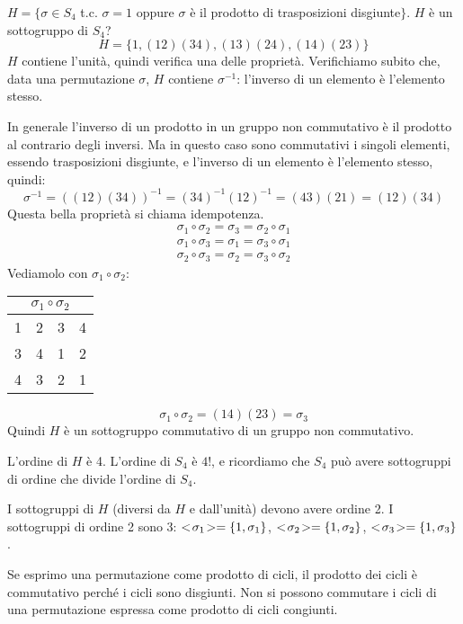 \begin{exmp}
$H = \{ \sigma \in S_4$ t.c. $\sigma = 1$ oppure $\sigma$ \`e il prodotto di trasposizioni disgiunte$ \}$. $H$ \`e un sottogruppo di $S_4$?
\[
H = \{ 1, (1 2) (3 4), (1 3) (2 4), (1 4) (2 3) \}
\]
$H$ contiene l'unit\`a, quindi verifica una delle propriet\`a. Verifichiamo subito che, data una permutazione $\sigma$, $H$ contiene $\sigma^{-1}$: l'inverso di un elemento \`e l'elemento stesso.

In generale l'inverso di un prodotto in un gruppo non commutativo \`e il prodotto al contrario degli inversi. Ma in questo caso sono commutativi i singoli elementi, essendo trasposizioni disgiunte, e l'inverso di un elemento \`e l'elemento stesso, quindi:
\[
\sigma^{-1} = \left( (1 2) (3 4) \right)^{-1} = (3 4)^{-1} (1 2)^{-1} = (4 3) (2 1) = (1 2) (3 4)
\]
Questa bella propriet\`a si chiama idempotenza.
\begin{gather*}
\sigma_1 \circ \sigma_2 = \sigma_3 = \sigma_2 \circ \sigma_1 \\
\sigma_1 \circ \sigma_3 = \sigma_1 = \sigma_3 \circ \sigma_1 \\
\sigma_2 \circ \sigma_3 = \sigma_2 = \sigma_3 \circ \sigma_2
\end{gather*}
Vediamolo con $\sigma_1 \circ \sigma_2$:
\begin{table}[ht]
\centering
\begin{tabular}{*{4}{c}}
\multicolumn{4}{c}{$\sigma_1 \circ \sigma_2$} \\
\hline
1 & 2 & 3 & 4 \\
3 & 4 & 1 & 2 \\
4 & 3 & 2 & 1
\end{tabular}
\end{table}
\[
\sigma_1 \circ \sigma_2 = (1 4) (2 3) = \sigma_3
\]
Quindi $H$ \`e un sottogruppo commutativo di un gruppo non commutativo.

L'ordine di $H$ \`e 4. L'ordine di $S_4$ \`e $4!$, e ricordiamo che $S_4$ pu\`o avere sottogruppi di ordine che divide l'ordine di $S_4$.

I sottogruppi di $H$ (diversi da $H$ e dall'unit\`a) devono avere ordine 2. I sottogruppi di ordine 2 sono 3: $<\!{\sigma_1}\!> = \{ 1, \sigma_1\}$, $<\!{\sigma_2}\!> = \{1, \sigma_2\}$, $<\!{\sigma_3}\!> = \{1, \sigma_3 \}$.
\end{exmp}
\begin{oss}
Se esprimo una permutazione come prodotto di cicli, il prodotto dei cicli \`e commutativo perch\'e i cicli sono disgiunti. Non si possono commutare i cicli di una permutazione espressa come prodotto di cicli congiunti.
\end{oss}

